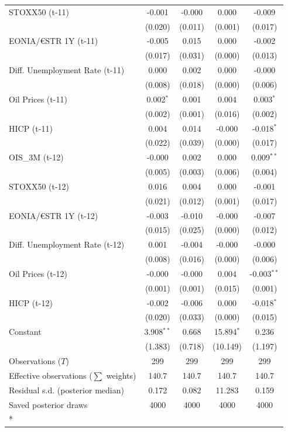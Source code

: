 \begin{longtable}[t]{lcccc}
STOXX50 (t-11) & -0.001 & -0.000 & 0.000 & -0.009\\
 & (0.020) & (0.011) & (0.001) & (0.017)\\
EONIA/€STR 1Y (t-11) & -0.005 & 0.015 & 0.000 & -0.002\\
 & (0.017) & (0.031) & (0.000) & (0.013)\\
Diff. Unemployment Rate (t-11) & 0.000 & 0.002 & 0.000 & -0.000\\
 & (0.008) & (0.018) & (0.000) & (0.006)\\
Oil Prices (t-11) & 0.002$^{*}$ & 0.001 & 0.004 & 0.003$^{*}$\\
 & (0.002) & (0.001) & (0.016) & (0.002)\\
HICP (t-11) & 0.004 & 0.014 & -0.000 & -0.018$^{*}$\\
 & (0.022) & (0.039) & (0.000) & (0.017)\\
OIS\_3M (t-12) & -0.000 & 0.002 & 0.000 & 0.009$^{**}$\\
 & (0.005) & (0.003) & (0.006) & (0.004)\\
STOXX50 (t-12) & 0.016 & 0.004 & 0.000 & -0.001\\
 & (0.021) & (0.012) & (0.001) & (0.017)\\
EONIA/€STR 1Y (t-12) & -0.003 & -0.010 & -0.000 & -0.007\\
 & (0.015) & (0.025) & (0.000) & (0.012)\\
Diff. Unemployment Rate (t-12) & 0.001 & -0.004 & -0.000 & -0.000\\
 & (0.008) & (0.016) & (0.000) & (0.006)\\
Oil Prices (t-12) & -0.000 & -0.000 & 0.004 & -0.003$^{**}$\\
 & (0.001) & (0.001) & (0.015) & (0.001)\\
HICP (t-12) & -0.002 & -0.006 & 0.000 & -0.018$^{*}$\\
 & (0.020) & (0.033) & (0.000) & (0.015)\\
Constant & 3.908$^{**}$ & 0.668 & 15.894$^{*}$ & 0.236\\
 & (1.383) & (0.718) & (10.149) & (1.197)\\
\midrule
Observations ($T$) & 299 & 299 & 299 & 299\\
Effective observations ($\sum$ weights) & 140.7 & 140.7 & 140.7 & 140.7\\
Residual s.d. (posterior median) & 0.172 & 0.082 & 11.283 & 0.159\\
Saved posterior draws & 4000 & 4000 & 4000 & 4000\\*
\end{longtable}
\endgroup{}

